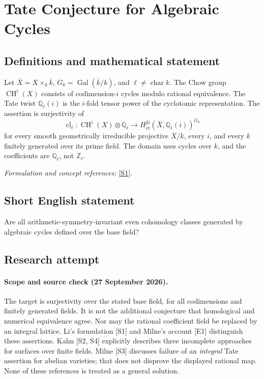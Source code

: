 \documentclass[11pt]{article}
\begin{document}
\section*{\texorpdfstring{Tate Conjecture for Algebraic Cycles}{Tate Conjecture for Algebraic Cycles}}\label{statement}
\subsection{Definitions and mathematical statement}
Let $\bar X=X\times_k\bar k$, $G_k=\operatorname{Gal}(\bar k/k)$, and $\ell\ne\operatorname{char}k$. The Chow group $\operatorname{CH}^i(X)$ consists of codimension-$i$ cycles modulo rational equivalence. The Tate twist ${\mathbb{Q}}_\ell(i)$ is the $i$-fold tensor power of the cyclotomic representation. The assertion is surjectivity of
\[
 \operatorname{cl}_\ell:\operatorname{CH}^i(X)\otimes{\mathbb{Q}}_\ell
 \longrightarrow H^{2i}_{\mathrm{\acute et}}(\bar X,{\mathbb{Q}}_\ell(i))^{G_k}
\]
for every smooth geometrically irreducible projective $X/k$, every $i$, and every $k$ finitely generated over its prime field. The domain uses cycles over $k$, and the coefficients are ${\mathbb{Q}}_\ell$, not ${\mathbb{Z}}_\ell$.
\par\smallskip\textit{Formulation and concept references:} \href{https://www.math.columbia.edu/~chaoli/docs/TateConjecture.html}{[S1]}.

\subsection{Short English statement}
Are all arithmetic-symmetry-invariant even cohomology classes generated by algebraic cycles defined over the base field?
\subsection{Research attempt}

\paragraph{Scope and source check (27 September 2026).}
The target is surjectivity over the stated base field, for all codimensions
 and finitely generated fields. It is not the additional conjecture that
 homological and numerical equivalence agree. Nor may the rational
 coefficient field be replaced by an integral lattice. Li's formulation
 [S1] and Milne's account [E1] distinguish these assertions. Kahn [S2, S4]
 explicitly describes three incomplete approaches for surfaces over finite
 fields. Milne [S3] discusses failure of an \emph{integral} Tate assertion
 for abelian varieties; that does not disprove the displayed rational map.
 None of these references is treated as a general solution.
\end{document}
